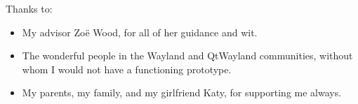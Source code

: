 \documentclass[12pt]{ucthesis}
\begin{document}
\begin{frontmatter}
\begin{abstract}
\end{abstract}


\begin{acknowledgements}

Thanks to:

\begin{itemize}
\item My advisor Zo{\"e} Wood, for all of her guidance and wit.
\item The wonderful people in the Wayland and QtWayland communities, without whom I would not have a functioning prototype.
\item My parents, my family, and my girlfriend Katy, for supporting me always.
\end{itemize}

\end{acknowledgements}

\tableofcontents

\listoftables

\listoffigures

\end{frontmatter}

\pagestyle{plain}

\renewcommand{\baselinestretch}{1.66}













\clearpage
\nocite{*}
%


%
\end{document}
